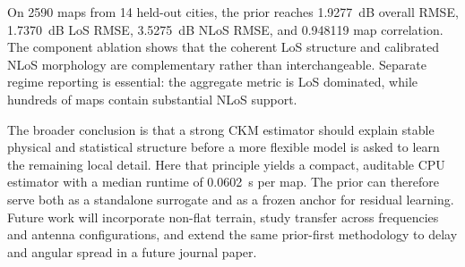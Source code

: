 \documentclass[10pt,conference]{IEEEtran}
\begin{document}
On 2590 maps from 14 held-out cities, the prior reaches \SI{1.9277}{dB}
overall RMSE, \SI{1.7370}{dB} LoS RMSE, \SI{3.5275}{dB} NLoS RMSE, and
0.948119 map correlation. The component ablation shows that the coherent LoS
structure and calibrated NLoS morphology are complementary rather than
interchangeable. Separate regime reporting is essential: the aggregate metric
is LoS dominated, while hundreds of maps contain substantial NLoS support.

The broader conclusion is that a strong CKM estimator should explain stable
physical and statistical structure before a more flexible model is asked to
learn the remaining local detail. Here that principle yields a compact,
auditable CPU estimator with a median runtime of \SI{0.0602}{s} per map. The
prior can therefore serve both as a standalone surrogate and as a frozen anchor
for residual learning. Future work will incorporate non-flat terrain, study
transfer across frequencies and antenna configurations, and extend the same
prior-first methodology to delay and angular spread in a future journal paper.



\end{document}
